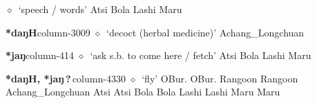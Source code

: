          $\diamond$~`speech / words'
         Atsi 
\hspace{1ex}
         Bola 
\hspace{1ex}
         Lashi 
\hspace{1ex}
         Maru 
  \item {\footnotesize \textbf{*daŋH}}{\tiny column-3009}
         $\diamond$~`decoct (herbal medicine)'
         Achang\_Longchuan 
  \item {\footnotesize \textbf{*jaŋ}}{\tiny column-414}
         $\diamond$~`ask s.b. to come here / fetch'
         Atsi 
\hspace{1ex}
         Bola 
\hspace{1ex}
         Lashi 
\hspace{1ex}
         Maru 
  \item {\footnotesize \textbf{*daŋH, *jaŋ\,?\,}}{\tiny column-4330}
         $\diamond$~`fly'
         OBur. 
\hspace{1ex}
         OBur. 
\hspace{1ex}
         Rangoon 
\hspace{1ex}
         Rangoon 
\hspace{1ex}
         Achang\_Longchuan 
\hspace{1ex}
         Atsi 
\hspace{1ex}
         Atsi 
\hspace{1ex}
         Bola 
\hspace{1ex}
         Bola 
\hspace{1ex}
         Lashi 
\hspace{1ex}
         Lashi 
\hspace{1ex}
         Maru 
\hspace{1ex}
         Maru 
